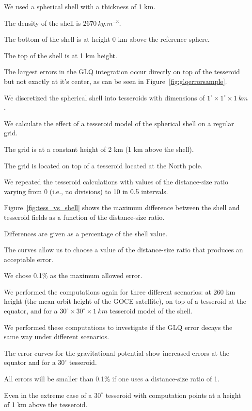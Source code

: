 \documentclass[paper,twocolumn]{geophysics}
\begin{document}
We used a spherical shell with a thickness of 1 km.

The density of the shell is $2670\ kg.m^{-3}$.

The bottom of the shell is at height 0 km above the reference sphere.

The top of the shell is at 1 km height.



The largest errors in the GLQ integration occur directly on top of the
tesseroid but not exactly at it's center, as can be seen in
Figure~\ref{fig:glqerrorsample}.

We discretized the spherical shell into tesseroids
with dimensions of $1^\circ \times 1^\circ \times 1\ km$.

We calculate the effect of a tesseroid model of the spherical shell on a
regular grid.

The grid is at a constant height of 2 km (1 km above the shell).

The grid is located on top of a tesseroid located at the North pole.


We repeated the tesseroid calculations with values of the distance-size ratio
varying from 0 (i.e., no divisions) to 10 in 0.5 intervals.

Figure~\ref{fig:tess_vs_shell} shows the maximum difference between the
shell and tesseroid fields as a function of the distance-size ratio.

Differences are given as a percentage of the shell value.

The curves allow us to choose a value of the distance-size ratio that
produces an acceptable error.

We chose 0.1\% as the maximum allowed error.

We performed the computations again for three different scenarios: at 260 km
height (the mean orbit height of the GOCE satellite), on top of a tesseroid at
the equator, and for a $30^\circ \times 30^\circ \times 1\ km$ tesseroid model
of the shell.

We performed these computations to investigate if the GLQ error decays the same
way under different scenarios.

The error curves for the gravitational potential show increased errors at the
equator and for a $30^\circ$ tesseroid.

All errors will be smaller than 0.1\% if one uses a distance-size ratio of 1.

Even in the extreme case of a $30^\circ$ tesseroid with computation points at a
height of 1 km above the tesseroid.
\end{document}
